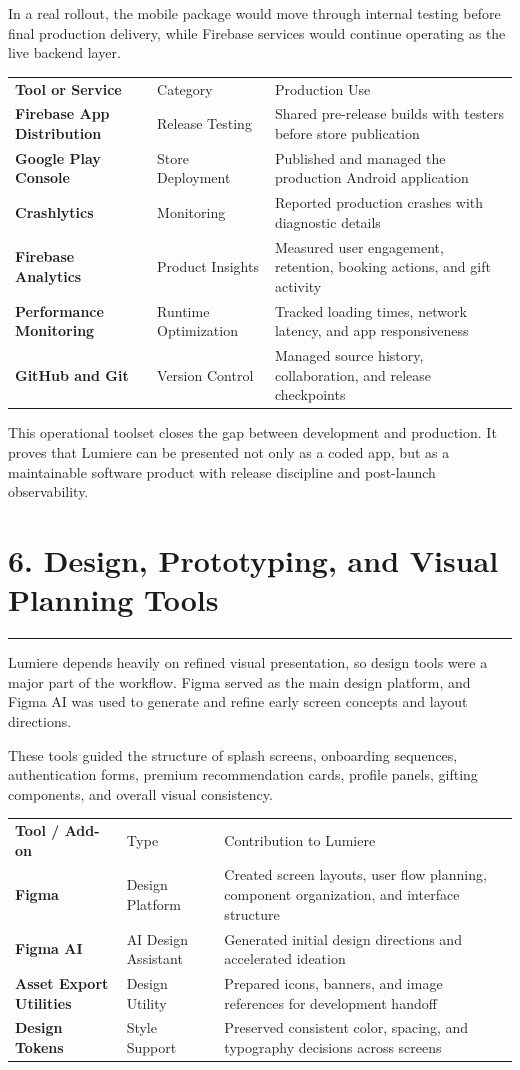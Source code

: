 \documentclass[11pt,a4paper]{article}
\newcommand{\PageTitle}[1]{\section*{#1}\vspace{2pt}\textcolor{LumiereGold}{\rule{\textwidth}{1.1pt}}\vspace{6pt}}
\newcommand{\SmallSpace}{\vspace{4pt}}
\begin{document}
In a real rollout, the mobile package would move through internal testing before final production delivery, while Firebase services would continue operating as the live backend layer.

\begin{tabularx}{\textwidth}{>{\bfseries}p{3.1cm} p{2.4cm} Y}
\color{white}Tool or Service & \color{white}Category & \color{white}Production Use \\
Firebase App Distribution & Release Testing & Shared pre-release builds with testers before store publication \\
Google Play Console & Store Deployment & Published and managed the production Android application \\
Crashlytics & Monitoring & Reported production crashes with diagnostic details \\
Firebase Analytics & Product Insights & Measured user engagement, retention, booking actions, and gift activity \\
Performance Monitoring & Runtime Optimization & Tracked loading times, network latency, and app responsiveness \\
GitHub and Git & Version Control & Managed source history, collaboration, and release checkpoints \\
\end{tabularx}

\SmallSpace
This operational toolset closes the gap between development and production. It proves that Lumiere can be presented not only as a coded app, but as a maintainable software product with release discipline and post-launch observability.

\newpage
\PageTitle{6. Design, Prototyping, and Visual Planning Tools}

Lumiere depends heavily on refined visual presentation, so design tools were a major part of the workflow. Figma served as the main design platform, and Figma AI was used to generate and refine early screen concepts and layout directions.

These tools guided the structure of splash screens, onboarding sequences, authentication forms, premium recommendation cards, profile panels, gifting components, and overall visual consistency.

\begin{tabularx}{\textwidth}{>{\bfseries}p{3.1cm} p{2.2cm} Y}
\color{white}Tool / Add-on & \color{white}Type & \color{white}Contribution to Lumiere \\
Figma & Design Platform & Created screen layouts, user flow planning, component organization, and interface structure \\
Figma AI & AI Design Assistant & Generated initial design directions and accelerated ideation \\
Asset Export Utilities & Design Utility & Prepared icons, banners, and image references for development handoff \\
Design Tokens & Style Support & Preserved consistent color, spacing, and typography decisions across screens \\
\end{tabularx}
\end{document}
